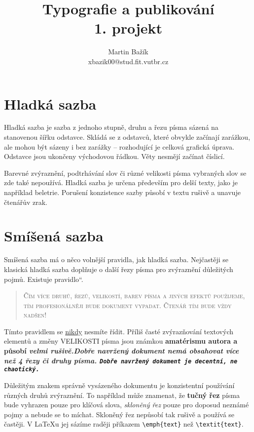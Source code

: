 \documentclass[a4paper,twocolumn,11pt]{article}
\author{Martin Bažík \\ xbazik00@stud.fit.vutbr.cz}
\title{Typografie a publikování \\ 1. projekt}
\date{}
\newcommand{\myuv}[1]{\quotedblbase #1\textquotedblleft}
\begin{document}
		\twocolumn
		\maketitle
    	
     	\section{Hladká sazba}
     	
     	Hladká sazba je sazba z jednoho stupně, druhu a řezu písma sázená na stanovenou šířku odstavce. Skládá se z odstavců, které obvykle začínají zarážkou, ale mohou být sázeny i bez zarážky \--- rozhodující je celková grafická úprava. Odstavce jsou ukončeny východovou řádkou. Věty nesmějí začínat číslicí.
     	
     	Barevné zvýraznění, podtrhávání slov či různé velikosti písma vybraných slov se zde také nepoužívá. Hladká sazba je určena především pro delší texty, jako je například beletrie. Porušení konzistence sazby působí v textu rušivě a unavuje čtenářův zrak.
     	
     	\section{Smíšená sazba}
     	
     	Smíšená sazba má o něco volnější pravidla, jak hladká sazba. Nejčastěji se klasická hladká sazba doplňuje o další řezy písma pro zvýraznění důležitých pojmů. Existuje \myuv{pravidlo}.
     	    	
     	\begin{quotation}
     	\textsc{Čím více druhů, řezů, velikostí, barev písma a jiných efektů použijeme, tím profesionálněji bude  dokument vypadat. Čtenář tím bude vždy nadšen!}
	    \end{quotation}
     	
     	
     	Tímto pravidlem se \underline{nikdy} nesmíte řídit. Příliš časté zvýrazňování textových elementů  a změny \huge{V}\LARGE{E}\Large{L}\large{I}\normalsize{K}\small{O}\footnotesize{S}\scriptsize{T}\tiny{I} \normalsize písma \large{jsou} \Large{známkou} \bfseries \LARGE{amatérismu} \normalfont\normalsize autora a působí \bfseries \itshape velmi \normalfont \itshape rušivě.\normalfont Dobře navržený dokument nemá obsahovat více než 4 řezy či druhy písma. \tt Dobře navržený dokument je decentní, ne chaotický.\normalfont	
     	
     	Důležitým znakem správně vysázeného dokumentu je konzistentní používání různých druhů zvýraznění. To například může znamenat, že \textbf{tučný řez} písma bude vyhrazen pouze pro klíčová slova, \textsl{skloněný řez} pouze pro doposud neznámé pojmy a nebude se to míchat. Skloněný řez nepůsobí tak rušivě a používá se častěji. V \LaTeX u jej sázíme raději příkazem  \verb+\emph{text}+ než  \verb+\textit{text}+.
     	
\end{document}

